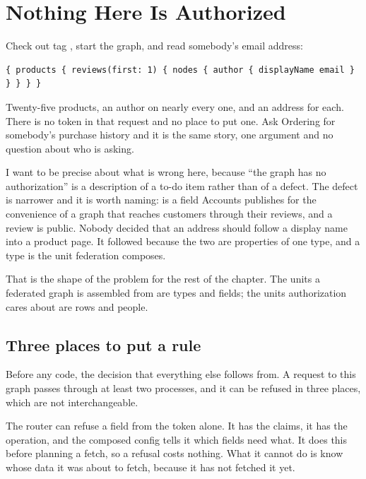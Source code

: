 \section{Nothing Here Is Authorized}
\label{sec:ch15-nothing-is-authorized}
%

Check out tag , start the graph, and read somebody's email address:

\begin{verbatim}
{ products { reviews(first: 1) { nodes { author { displayName email } } } } }
\end{verbatim}

Twenty-five products, an author on nearly every one, and an address for each.
There is no token in that request and no place to put one. Ask Ordering for
somebody's purchase history and it is the same story, one argument and no
question about who is asking.

I want to be precise about what is wrong here, because \enquote{the graph has no
authorization} is a description of a to-do item rather than of a defect. The
defect is narrower and it is worth naming:  is a field
Accounts publishes for the convenience of a graph that reaches customers through
their reviews, and a review is public. Nobody decided that an address should
follow a display name into a product page. It followed because the two are
properties of one type, and a type is the unit federation composes.

That is the shape of the problem for the rest of the chapter. The units a
federated graph is assembled from are types and fields; the units authorization
cares about are rows and people.

\subsection*{Three places to put a rule}

%
Before any code, the decision that everything else follows from. A request to
this graph passes through at least two processes, and it can be refused in three
places, which are not interchangeable.

%
The router can refuse a field from the token alone. It has the claims, it has
the operation, and the composed config tells it which fields need what. It does
this before planning a fetch, so a refusal costs nothing. What it cannot do is
know whose data it was about to fetch, because it has not fetched it yet.

